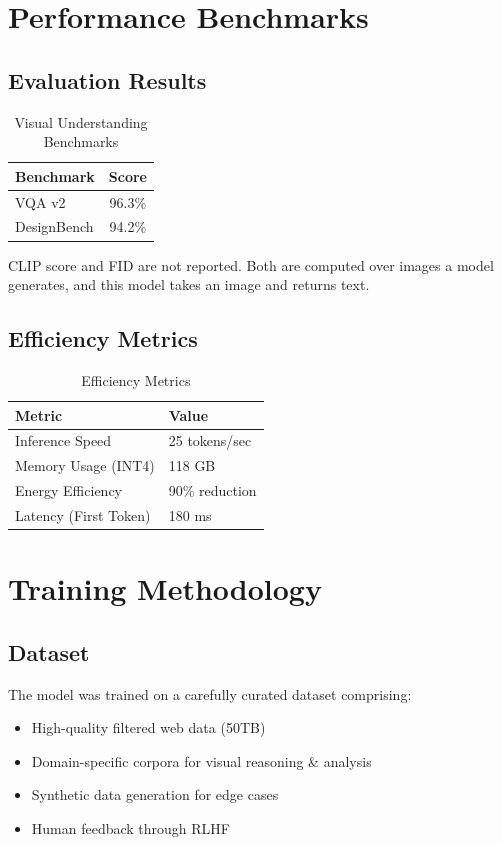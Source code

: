 \documentclass[11pt,a4paper]{article}
\begin{document}
\section{Performance Benchmarks}

\subsection{Evaluation Results}

\begin{table}[H]
\centering
\begin{tabular}{lc}
\toprule
\textbf{Benchmark} & \textbf{Score} \\
\midrule
VQA v2 & 96.3\% \\
DesignBench & 94.2\% \\
\bottomrule
\end{tabular}
\caption{Visual Understanding Benchmarks}
\end{table}

CLIP score and FID are not reported. Both are computed over images a model
generates, and this model takes an image and returns text.

\subsection{Efficiency Metrics}

\begin{table}[H]
\centering
\begin{tabular}{ll}
\toprule
\textbf{Metric} & \textbf{Value} \\
\midrule
Inference Speed & 25 tokens/sec \\
Memory Usage (INT4) & 118 GB \\
Energy Efficiency & 90\% reduction \\
Latency (First Token) & 180 ms \\
\bottomrule
\end{tabular}
\caption{Efficiency Metrics}
\end{table}

\section{Training Methodology}

\subsection{Dataset}
The model was trained on a carefully curated dataset comprising:
\begin{itemize}
    \item High-quality filtered web data (50TB)
    \item Domain-specific corpora for visual reasoning \& analysis
    \item Synthetic data generation for edge cases
    \item Human feedback through RLHF
\end{itemize}
\end{document}
